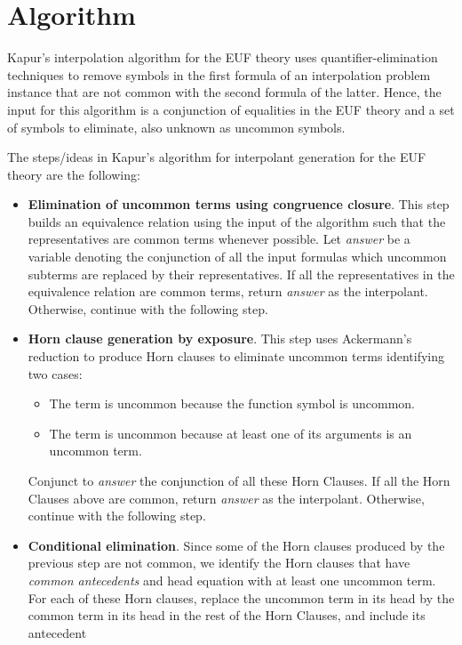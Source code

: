 \section{Algorithm}

Kapur's interpolation algorithm for the EUF theory uses quantifier-elimination
techniques to remove symbols in the first formula of an interpolation problem instance
that are not common with the second formula of the latter. 
Hence, the input for this algorithm is a conjunction of equalities in the
EUF theory and a set of symbols to eliminate, also unknown as uncommon symbols.

The steps/ideas in Kapur's algorithm for interpolant generation for the EUF theory
are the following:

\begin{itemize}
\item \textbf{Elimination of uncommon terms using congruence closure}.
  This step builds an equivalence
  relation using the input of the algorithm such that the representatives are common terms
  whenever possible. Let \emph{answer} be a variable denoting the 
  conjunction of all the input formulas
  which uncommon subterms are replaced by their representatives.
  If all the representatives in the equivalence relation are common terms, return \emph{answer}
  as the interpolant. Otherwise, continue with the following step.
\item \textbf{Horn clause generation by exposure}. This step uses Ackermann's 
  reduction \cite{10.5555/1391237}
  to produce Horn clauses to eliminate uncommon terms identifying two cases:
  \begin{itemize}
  \item The term is uncommon because the function symbol is uncommon.
  \item The term is uncommon because at least one of its arguments is
    an uncommon term.
  \end{itemize}
  Conjunct to \emph{answer} the conjunction of all these Horn Clauses.
  If all the Horn Clauses above are common, return \emph{answer} as the interpolant.
  Otherwise, continue with the following step.
\item \textbf{Conditional elimination}. Since some of the Horn clauses produced by
  the previous step are not common, we identify the Horn clauses that have
  \emph{common antecedents} and head equation with at least one uncommon term. For each
  of these Horn clauses, replace the uncommon term in its head by the common term in its head
  in the rest of the Horn Clauses, and include its antecedent 

\end{itemize}
